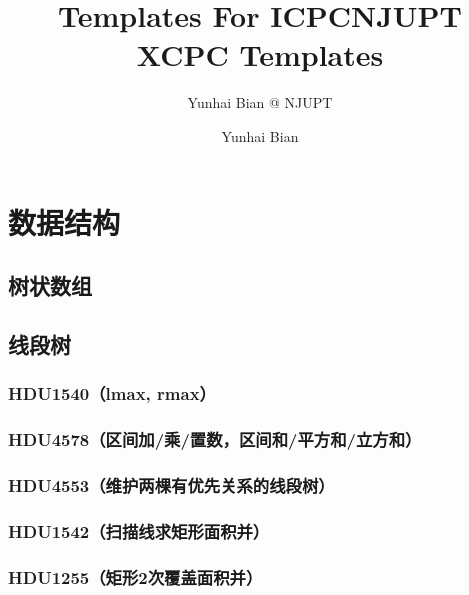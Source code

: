 \documentclass[12pt,a4paper]{article}
\title{Templates For ICPC}
\author{Yunhai Bian @ NJUPT}
\begin{document}
\title{NJUPT XCPC Templates}
\author {Yunhai Bian}
\maketitle
\tableofcontents
\newpage
\section{数据结构}
\subsection{树状数组}

\subsection{线段树}
\subsubsection{HDU1540（lmax, rmax）}
\begin{spacing}{1.5}

\end{spacing}

\subsubsection{HDU4578（区间加/乘/置数，区间和/平方和/立方和）}
\begin{spacing}{1.5}

\end{spacing}

\subsubsection{HDU4553（维护两棵有优先关系的线段树）}
\begin{spacing}{1.5}

\end{spacing}

\subsubsection{HDU1542（扫描线求矩形面积并）}
\begin{spacing}{1.5}

\end{spacing}

\subsubsection{HDU1255（矩形2次覆盖面积并）}
\begin{spacing}{1.5}

\end{spacing}

\end{document}
